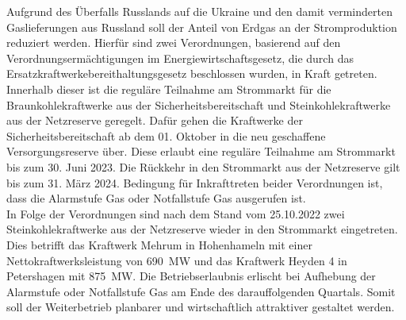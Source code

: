 		Aufgrund des Überfalls Russlands auf die Ukraine und den damit verminderten Gaslieferungen aus Russland soll der Anteil von Erdgas an der Stromproduktion reduziert werden.
		Hierfür sind zwei Verordnungen, basierend auf den Verordnungsermächtigungen im Energiewirtschaftsgesetz, die durch das Ersatzkraftwerkebereithaltungsgesetz beschlossen wurden, in Kraft getreten.
		Innerhalb dieser ist die reguläre Teilnahme am Strommarkt für die Braunkohlekraftwerke aus der Sicherheitsbereitschaft und Steinkohlekraftwerke aus der Netzreserve geregelt.
		Dafür gehen die Kraftwerke der Sicherheitsbereitschaft ab dem 01. Oktober in die neu geschaffene Versorgungsreserve über.
		Diese erlaubt eine reguläre Teilnahme am Strommarkt bis zum 30. Juni 2023.
		Die Rückkehr in den Strommarkt aus der Netzreserve gilt bis zum 31. März 2024.
		Bedingung für Inkrafttreten beider Verordnungen ist, dass die Alarmstufe Gas oder Notfallstufe Gas ausgerufen ist. \\
		
		In Folge der Verordnungen sind nach dem Stand vom 25.10.2022 zwei Steinkohlekraftwerke aus der Netzreserve wieder in den Strommarkt eingetreten.
		Dies betrifft das Kraftwerk Mehrum in Hohenhameln mit einer Nettokraftwerksleistung von \SI{690}{\mega\watt} und das Kraftwerk Heyden 4 in Petershagen mit \SI{875}{\mega\watt}.
		Die Betriebserlaubnis erlischt bei Aufhebung der Alarmstufe oder Notfallstufe Gas am Ende des darauffolgenden Quartals.
		Somit soll der Weiterbetrieb planbarer und wirtschaftlich attraktiver gestaltet werden.
	